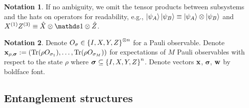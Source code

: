 \documentclass[
aps,
pra,
twocolumn,
floatfix,
]{revtex4-2}
\theoremstyle{plain}
\theoremstyle{definition}
\newtheorem{notation}{Notation}
\newcommand{\pob}{O}
\newcommand{\dm}{\rho}
\newcommand{\px}{X}
\newcommand{\pz}{Z}
\newcommand{\bmsigma}{\bm{\sigma}}
\begin{document}

\begin{notation}
	If no ambiguity,
	we omit the tensor products between subsystems and the hats on operators for readability,
	e.g.,
	$\ket{\psi_A}\ket{\psi_B}\equiv \ket{\psi_A}\otimes \ket{\psi_B}$ 
	and $\px^{(1)}\pz^{(3)} \equiv \hat{X} \otimes \identity \otimes \hat{Z}$.
\end{notation}
\begin{notation}
	Denote $\pob_{\sigma}\in \qty{I,X,Y,Z}^{\otimes n}$ for a Pauli observable.
	Denote $\vbx_{\dm,\bmsigma}:=(\Tr(\dm\pob_{\sigma_1}),\dots,\Tr(\dm\pob_{\sigma_M}))$ for expectations of $M$ Pauli observables with respect to the state $\dm$ where $\bmsigma\subseteq \qty{I,X,Y,Z}^n$.
	Denote vectors $\vb{x}$, $\bmsigma$, $\vb{w}$ by boldface font.
\end{notation}

\subsection{Entanglement structures}
\end{document}

